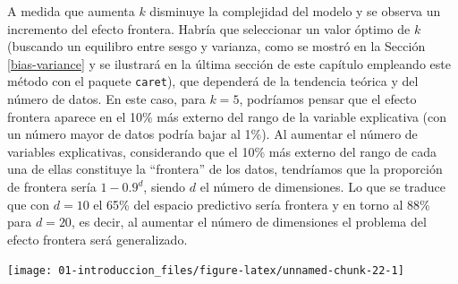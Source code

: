 \documentclass[
]{book}
\newenvironment{Shaded}{\begin{snugshade}}{\end{snugshade}}
\newcommand{\DataTypeTok}[1]{\textcolor[rgb]{0.13,0.29,0.53}{#1}}
\newcommand{\DecValTok}[1]{\textcolor[rgb]{0.00,0.00,0.81}{#1}}
\newcommand{\FloatTok}[1]{\textcolor[rgb]{0.00,0.00,0.81}{#1}}
\newcommand{\KeywordTok}[1]{\textcolor[rgb]{0.13,0.29,0.53}{\textbf{#1}}}
\newcommand{\NormalTok}[1]{#1}
\newcommand{\OperatorTok}[1]{\textcolor[rgb]{0.81,0.36,0.00}{\textbf{#1}}}
\newcommand{\OtherTok}[1]{\textcolor[rgb]{0.56,0.35,0.01}{#1}}
\newcommand{\StringTok}[1]{\textcolor[rgb]{0.31,0.60,0.02}{#1}}
\theoremstyle{break}
\theoremstyle{definition}
\theoremstyle{definition}
\theoremstyle{definition}
\theoremstyle{remark}
\begin{document}
A medida que aumenta \(k\) disminuye la complejidad del modelo y se observa un incremento del efecto frontera.
Habría que seleccionar un valor óptimo de \(k\) (buscando un equilibro entre sesgo y varianza, como se mostró en la Sección \ref{bias-variance} y se ilustrará en la última sección de este capítulo empleando este método con el paquete \texttt{caret}), que dependerá de la tendencia teórica y del número de datos.
En este caso, para \(k=5\), podríamos pensar que el efecto frontera aparece en el 10\% más externo del rango de la variable explicativa (con un número mayor de datos podría bajar al 1\%).
Al aumentar el número de variables explicativas, considerando que el 10\% más externo del rango de cada una de ellas constituye la ``frontera'' de los datos, tendríamos que la proporción de frontera sería \(1-0.9^d\), siendo \(d\) el número de dimensiones.
Lo que se traduce que con \(d = 10\) el 65\% del espacio predictivo sería frontera y en torno al 88\% para \(d=20\), es decir, al aumentar el número de dimensiones el problema del efecto frontera será generalizado.

\begin{Shaded}
\end{Shaded}

\begin{center}\texttt{[image: 01-introduccion\_files/figure-latex/unnamed-chunk-22-1]} \end{center}
\end{document}
